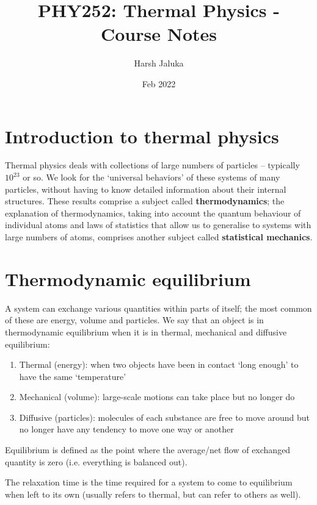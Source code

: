 \documentclass[11pt]{article}
\title{PHY252: Thermal Physics - Course Notes}
\author{Harsh Jaluka}
\date{Feb 2022}
\begin{document}
\begin{titlepage}
\maketitle 
\end{titlepage}

\newpage 
\tableofcontents

\newpage
\section{Introduction to thermal physics}
Thermal physics deals with collections of large numbers of particles -- typically $10^{23}$ or so. We look for the `universal behaviors' of these systems of many particles, without having to know detailed information about their internal structures. These results comprise a subject called \textbf{thermodynamics}; the explanation of thermodynamics, taking into account the quantum behaviour of individual atoms and laws of statistics that allow us to generalise to systems with large numbers of atoms, comprises another subject called \textbf{statistical mechanics}. 

\section{Thermodynamic equilibrium}
A system can exchange various quantities within parts of itself; the most common of these are energy, volume and particles. We say that an object is in thermodynamic equilibrium when it is in thermal, mechanical and diffusive equilibrium: 
\begin{enumerate}
    \item Thermal (energy): when two objects have been in contact `long enough' to have the same `temperature'
    \item Mechanical (volume): large-scale motions can take place but no longer do
    \item Diffusive (particles): molecules of each substance are free to move around but no longer have any tendency to move one way or another
\end{enumerate}
Equilibrium is defined as the point where the average/net flow of exchanged quantity is zero (i.e. everything is balanced out).

The relaxation time is the time required for a system to come to equilibrium when left to its own (usually refers to thermal, but can refer to others as well). 
\end{document}
